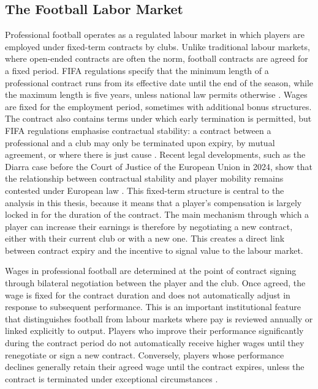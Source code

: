 \documentclass{article}
\begin{document}
\subsection{The Football Labor Market}

Professional football operates as a regulated labour market in which players are employed under fixed-term contracts by clubs. Unlike traditional labour markets, where open-ended contracts are often the norm, football contracts are agreed for a fixed period. FIFA regulations specify that the minimum length of a professional contract runs from its effective date until the end of the season, while the maximum length is five years, unless national law permits otherwise \citep{fifa_rstp_2025}. Wages are fixed for the employment period, sometimes with additional bonus structures. The contract also contains terms under which early termination is permitted, but FIFA regulations emphasise contractual stability: a contract between a professional and a club may only be terminated upon expiry, by mutual agreement, or where there is just cause \citep{fifa_rstp_2025}. Recent legal developments, such as the Diarra case before the Court of Justice of the European Union in 2024, show that the relationship between contractual stability and player mobility remains contested under European law \citep{cjeu_diarra_2024}. This fixed-term structure is central to the analysis in this thesis, because it means that a player's compensation is largely locked in for the duration of the contract. The main mechanism through which a player can increase their earnings is therefore by negotiating a new contract, either with their current club or with a new one. This creates a direct link between contract expiry and the incentive to signal value to the labour market. \

Wages in professional football are determined at the point of contract signing through bilateral negotiation between the player and the club. Once agreed, the wage is fixed for the contract duration and does not automatically adjust in response to subsequent performance. This is an important institutional feature that distinguishes football from labour markets where pay is reviewed annually or linked explicitly to output. Players who improve their performance significantly during the contract period do not automatically receive higher wages until they renegotiate or sign a new contract. Conversely, players whose performance declines generally retain their agreed wage until the contract expires, unless the contract is terminated under exceptional circumstances \citep{fifa_rstp_2025}. \
\end{document}
